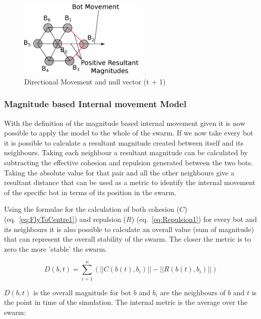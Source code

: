 \documentclass[10pt,journal,letterpaper,twoside]{IEEEtran}
\newcommand{\stability}{internal movement}
\newcommand{\Stability}{Internal movement}
\newcommand{\Eq}{eq.}
\begin{document}
\begin{figure}[H]
\begin{center}
\includegraphics[width=6cm]{figures/StabilityNullVector2}
\end{center}
\caption{Directional Movement and null vector (t + 1)} \label{methods:StabilityNullVector2}
\end{figure}

\subsubsection{Magnitude based \Stability{} Model}\label{Section:StabilityModel}

With the definition of the magnitude based \stability{} given it is
now possible to apply the model to the whole of the swarm. If we now
take every bot it is possible to calculate a resultant magnitude
created between itself and its neighbours. Taking each neighbour a
resultant magnitude can be calculated by subtracting the effective
cohesion and repulsion generated between the two bots. Taking the
absolute value for that pair and all the other neighbours give a
resultant distance that can be used as a metric to identify the
\stability{} of the specific bot in terms of its position in the
swarm.

Using the formulae for the calculation of both cohesion ($C$)
(\Eq{}~\ref{eq:FlyToCentre1}) and repulsion ($R$)
(\Eq{}~\ref{eq:Repulsion1}) for every bot and its neighbours it is
also possible to calculate an overall value (sum of magnitude) that
can represent the overall stability of the swarm. The closer the
metric is to zero the more 'stable' the swarm.


\begin{equation}
\label{eq:BotStabilityT}
D(b,t) = \sum_{i=1}^{n}(||C(b(t),b_{i})|| - ||R(b(t),b_{i})||)
\end{equation}

$D(b,t)$ is the overall magnitude for bot $b$ and $b_i$ are the
neighbours of $b$ and $t$ is the point in time of the simulation. The
internal metric is the average over the swarm:

\end{document}
